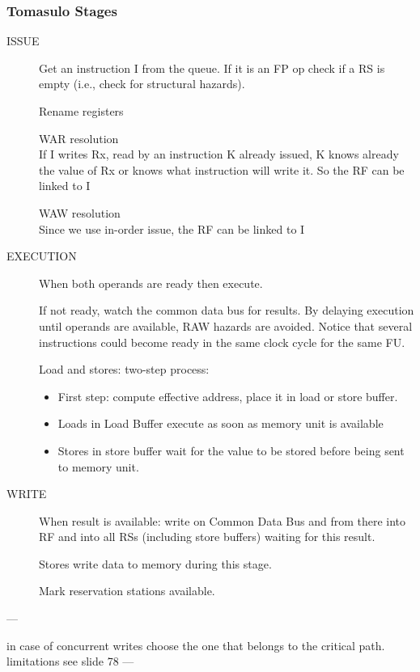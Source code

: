 \subsubsection{Tomasulo Stages}
\begin{description}
    \item[ISSUE] Get an instruction I from the queue.
    If it is an FP op check if a RS is empty (i.e., check for structural hazards).

    Rename registers

    WAR resolution\\
    If I writes Rx, read by an instruction K already issued, K
    knows already the value of Rx or knows what instruction
    will write it.
    So the RF can be linked to I

    WAW resolution\\
    Since we use in-order issue, the RF can be linked to I
    \item[EXECUTION] When both operands are ready then execute.

    If not ready, watch the common data bus for results.
    By delaying execution until operands are available, RAW
    hazards are avoided.
    Notice that several instructions could become ready in the
    same clock cycle for the same FU\@.

    Load and stores: two-step process:
    \begin{itemize}[noitemsep]
        \item First step: compute effective address, place it in load or
        store buffer.
        \item Loads in Load Buffer execute as soon as memory unit is
    available
        \item Stores in store buffer wait for the value to be stored before
    being sent to memory unit.
    \end{itemize}

    \item[WRITE] When result is available: write on Common Data Bus and from there into RF and into all RSs
    (including store buffers) waiting for this result.

    Stores write data to memory during this stage.

    Mark reservation stations available.
\end{description}

---

in case of concurrent writes choose the one that belongs to the critical path.
limitations see slide 78
---

